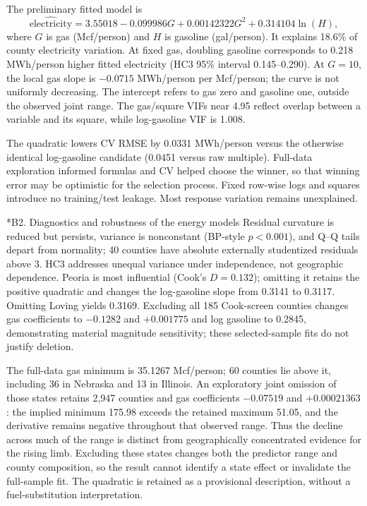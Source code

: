 \documentclass[11pt,letterpaper]{article}
\makeatletter
\renewcommand\subsection{\@startsection{subsection}{2}{0pt}{1.2ex plus .3ex minus .2ex}{.5ex}{\normalfont\normalsize\bfseries}}
\makeatother
\begin{document}
\begin{table}[!htbp]\centering\small
\caption{Energy-consumption candidate models, all $n=3,142$. RSE and pooled, seeded 10-fold CV RMSE are in MWh/person. Common random county folds compare explored formulas; the winning RMSE is not independent validation of selection or new-region performance.}
\label{tab:models}
\end{table}
The preliminary fitted model is
\[
\widehat{\mathrm{electricity}}=3.55018-0.099986G+0.00142322G^2+0.314104\ln(H),
\]
where $G$ is gas (Mcf/person) and $H$ is gasoline (gal/person). It explains 18.6\% of county electricity variation. At fixed gas, doubling gasoline corresponds to 0.218 MWh/person higher fitted electricity (HC3 95\% interval 0.145--0.290). At $G=10$, the local gas slope is $-0.0715$ MWh/person per Mcf/person; the curve is not uniformly decreasing. The intercept refers to gas zero and gasoline one, outside the observed joint range. The gas/square VIFs near 4.95 reflect overlap between a variable and its square, while log-gasoline VIF is 1.008.

The quadratic lowers CV RMSE by 0.0331 MWh/person versus the otherwise identical log-gasoline candidate (0.0451 versus raw multiple). Full-data exploration informed formulas and CV helped choose the winner, so that winning error may be optimistic for the selection process. Fixed row-wise logs and squares introduce no training/test leakage. Most response variation remains unexplained.

\subsection*{B2. Diagnostics and robustness of the energy models}
Residual curvature is reduced but persists, variance is nonconstant (BP-style $p<0.001$), and Q--Q tails depart from normality; 40 counties have absolute externally studentized residuals above 3. HC3 addresses unequal variance under independence, not geographic dependence. Peoria is most influential (Cook's $D=0.132$); omitting it retains the positive quadratic and changes the log-gasoline slope from 0.3141 to 0.3117. Omitting Loving yields 0.3169. Excluding all 185 Cook-screen counties changes gas coefficients to $-0.1282$ and $+0.001775$ and log gasoline to 0.2845, demonstrating material magnitude sensitivity; these selected-sample fits do not justify deletion.

The full-data gas minimum is 35.1267 Mcf/person; 60 counties lie above it, including 36 in Nebraska and 13 in Illinois. An exploratory joint omission of those states retains 2,947 counties and gas coefficients $-0.07519$ and $+0.00021363$: the implied minimum 175.98 exceeds the retained maximum 51.05, and the derivative remains negative throughout that observed range. Thus the decline across much of the range is distinct from geographically concentrated evidence for the rising limb. Excluding these states changes both the predictor range and county composition, so the result cannot identify a state effect or invalidate the full-sample fit. The quadratic is retained as a provisional description, without a fuel-substitution interpretation.
\end{document}
